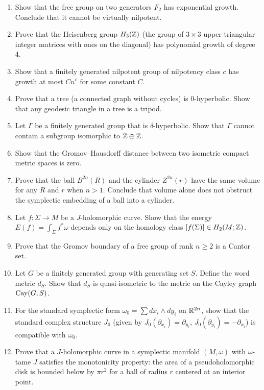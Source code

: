\begin{enumerate}
    \item [B] Show that the free group on two generators \(F_2\) has exponential growth. Conclude that it cannot be virtually nilpotent.
    \item [B] Prove that the Heisenberg group \(H_3(\mathbb{Z})\) (the group of \(3 \times 3\) upper triangular integer matrices with ones on the diagonal) has polynomial growth of degree 4.
    \item [I] Show that a finitely generated nilpotent group of nilpotency class \(c\) has growth at most \(C n^c\) for some constant \(C\).
    \item [B] Prove that a tree (a connected graph without cycles) is 0-hyperbolic. Show that any geodesic triangle in a tree is a tripod.
    \item [I] Let \(\Gamma\) be a finitely generated group that is \(\delta\)-hyperbolic. Show that \(\Gamma\) cannot contain a subgroup isomorphic to \(\mathbb{Z} \oplus \mathbb{Z}\).
    \item [B] Show that the Gromov--Hausdorff distance between two isometric compact metric spaces is zero.
    \item [B] Prove that the ball \(B^{2n}(R)\) and the cylinder \(Z^{2n}(r)\) have the same volume for any \(R\) and \(r\) when \(n > 1\). Conclude that volume alone does not obstruct the symplectic embedding of a ball into a cylinder.
    \item [I] Let \(f: \Sigma \to M\) be a \(J\)-holomorphic curve. Show that the energy \(E(f) = \int_\Sigma f^*\omega\) depends only on the homology class \([f(\Sigma)] \in H_2(M; \mathbb{Z})\).
    \item [I] Prove that the Gromov boundary of a free group of rank \(n \geq 2\) is a Cantor set.
    \item [B] Let \(G\) be a finitely generated group with generating set \(S\). Define the word metric \(d_S\). Show that \(d_S\) is quasi-isometric to the metric on the Cayley graph \(\operatorname{Cay}(G, S)\).
    \item [B] For the standard symplectic form \(\omega_0 = \sum dx_i \wedge dy_i\) on \(\mathbb{R}^{2n}\), show that the standard complex structure \(J_0\) (given by \(J_0(\partial_{x_i}) = \partial_{y_i}\), \(J_0(\partial_{y_i}) = -\partial_{x_i}\)) is compatible with \(\omega_0\).
    \item [I] Prove that a \(J\)-holomorphic curve in a symplectic manifold \((M, \omega)\) with \(\omega\)-tame \(J\) satisfies the monotonicity property: the area of a pseudoholomorphic disk is bounded below by \(\pi r^2\) for a ball of radius \(r\) centered at an interior point.

\end{enumerate}
